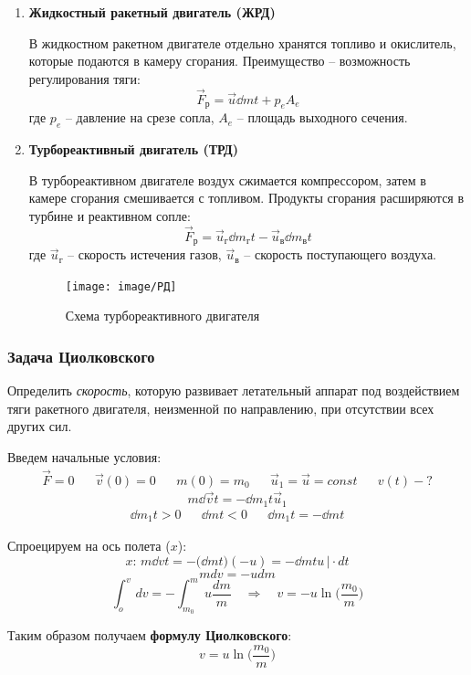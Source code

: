 \begin{enumerate}
	\item \textbf{Жидкостный ракетный двигатель (ЖРД)}

	В жидкостном ракетном двигателе отдельно хранятся топливо и окислитель, которые подаются в камеру сгорания. Преимущество -- возможность регулирования тяги:
	\[ \vec{F}_\text{р} = \vec{u} \dd{m}{t} + p_e A_e \]
	где $p_e$ -- давление на срезе сопла, $A_e$ -- площадь выходного сечения.
	\item \textbf{Турбореактивный двигатель (ТРД)}

	В турбореактивном двигателе воздух сжимается компрессором, затем в камере сгорания смешивается с топливом. Продукты сгорания расширяются в турбине и реактивном сопле:
	\[ \vec{F}_\text{р} = \vec{u}_\text{г} \dd{m_\text{г}}{t} - \vec{u}_\text{в} \dd{m_\text{в}}{t} \]
	где $\vec{u}_\text{г}$ -- скорость истечения газов, $\vec{u}_\text{в}$ -- скорость поступающего воздуха.

	\begin{figure}[H]
		\centering
		\texttt{[image: image/РД]}
		\caption{Схема турбореактивного двигателя}
		\label{fig:6}
	\end{figure}
\end{enumerate}
\newpage
\subsubsection*{Задача Циолковского}
Определить \textit{скорость}, которую развивает летательный аппарат под воздействием тяги ракетного двигателя, неизменной по направлению, при отсутствии всех других сил.

Введем начальные условия:
\[\begin{aligned}
	\vec{F} = 0 && \vec{v}(0) = 0 && m(0) = m_0 && \vec{u}_1 = \vec{u} = const && v(t) - ?
\end{aligned}\]
\[m \dd{\vec{v}}{t} = - \dd{m_1}{t} \vec{u}_1\]
\[\begin{aligned}
	\dd{m_1}{t} > 0 && \dd{m}{t} < 0 && \dd{m_1}{t} = - \dd{m}{t}
\end{aligned}\]

Спроецируем на ось полета ($x$):
\[x: \, m \dd{v}{t} = -\Big(\dd{m}{t}\Big)(-u) = - \dd{m}{t} u \, \Big| \cdot dt\]
\[m dv = -u dm\]
\[\int_{o}^{v} \, dv = - \int_{m_0}^{m} u \frac{dm}{m} \quad \Rightarrow\quad v = - u \ln\Big(\frac{m_0}{m}\Big)\]

Таким образом получаем \textbf{формулу Циолковского}:
\[\boxed{v = u \ln\Big(\frac{m_0}{m}\Big)}\]